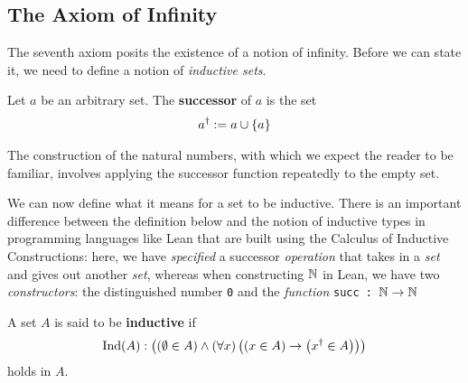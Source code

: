 \begin{baxiom}
    \sorry
\end{baxiom}

\begin{baxiom}
    \sorry
\end{baxiom}

\begin{baxiom}
    \sorry
\end{baxiom}

\sorry


\subsection{The Axiom of Infinity}

The seventh axiom posits the existence of a notion of infinity. Before we can state it, we need to define a notion of \textit{inductive sets}.

\begin{boxdefinition}\label{Ch3:Def:succ_dg}
    Let $a$ be an arbitrary set. The \textbf{successor} of $a$ is the set
    \begin{align*}
        a^{\dagger} := a \cup \left\{ a \right\}
    \end{align*}
\end{boxdefinition}

The construction of the natural numbers, with which we expect the reader to be familiar, involves applying the successor function repeatedly to the empty set.

We can now define what it means for a set to be inductive. There is an important difference between the definition below and the notion of inductive types in programming languages like Lean that are built using the Calculus of Inductive Constructions: here, we have \textit{specified} a successor \textit{operation} that takes in a \textit{set} and gives out another \textit{set}, whereas when constructing $\mathbb{N}$ in Lean, we have two \textit{constructors}: the distinguished number \texttt{0} and the \textit{function} \texttt{succ~:~$\mathbb{N} \to \mathbb{N}$}

\begin{boxdefinition}[Inductivity]
    A set $A$ is said to be \textbf{inductive} if
    \begin{align*}
        \operatorname{Ind}(A) : \left( \left( \emptyset \in A \right) \land \left( \forall x \right)\left( \left( x \in A \right) \to \left( x^{\dagger} \in A \right) \right) \right)
    \end{align*}
    holds in $A$.
\end{boxdefinition}

